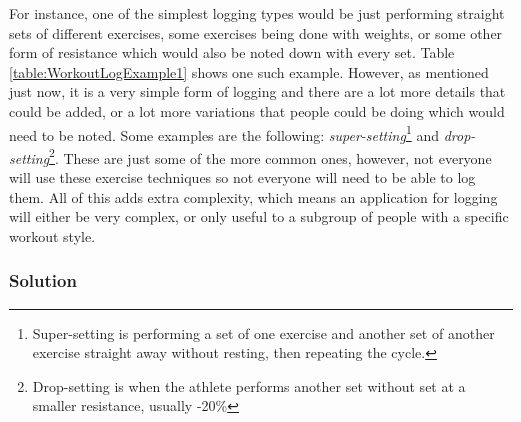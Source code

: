 \documentclass{article}
\newcommand{\vspaceconst}{-2ex}
\begin{document}
\begin{multicols}{2}
For instance, one of the simplest logging types would be just performing straight sets of different exercises, some exercises being done with weights, or some other form of resistance which would also be noted down with every set. Table \ref{table:WorkoutLogExample1} shows one such example. However, as mentioned just now, it is a very simple form of logging and there are a lot more details that could be added, or a lot more variations that people could be doing which would need to be noted. Some examples are the following: \textit{super-setting}\footnote{Super-setting is performing a set of one exercise and another set of another exercise straight away without resting, then repeating the cycle.} and \textit{drop-setting}\footnote{Drop-setting is when the athlete performs another set without set at a smaller resistance, usually -20\%}. These are just some of the more common ones, however, not everyone will use these exercise techniques so not everyone will need to be able to log them. All of this adds extra complexity, which means an application for logging will either be very complex, or only useful to a subgroup of people with a specific workout style.


\subsubsection{Solution}
\vspace{\vspaceconst}
 

\end{multicols}
\end{document}
